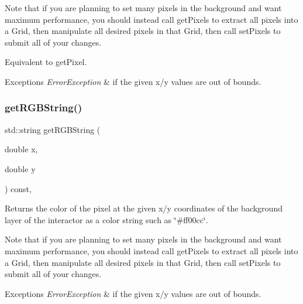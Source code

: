 Note that if you are planning to set many pixels in the background and want maximum performance, you should instead call get\+Pixels to extract all pixels into a Grid, then manipulate all desired pixels in that Grid, then call set\+Pixels to submit all of your changes.

Equivalent to get\+Pixel.


\begin{DoxyExceptions}{Exceptions}
{\em Error\+Exception} & if the given x/y values are out of bounds. \\
\hline
\end{DoxyExceptions}
\mbox{\label{classsgl_1_1GDrawingSurface_a456d3582acc3544f37d939f5cb8802fe}} 
\subsubsection{\texorpdfstring{get\+R\+G\+B\+String()}{getRGBString()}}
{\footnotesize\ttfamily std\+::string get\+R\+G\+B\+String (\begin{DoxyParamCaption}\item[{double}]{x,  }\item[{double}]{y }\end{DoxyParamCaption}) const\hspace{0.3cm}{\ttfamily [virtual]}, {\ttfamily [inherited]}}



Returns the color of the pixel at the given x/y coordinates of the background layer of the interactor as a color string such as \char`\"{}\#ff00cc\char`\"{}. 

Note that if you are planning to set many pixels in the background and want maximum performance, you should instead call get\+Pixels to extract all pixels into a Grid, then manipulate all desired pixels in that Grid, then call set\+Pixels to submit all of your changes.


\begin{DoxyExceptions}{Exceptions}
{\em Error\+Exception} & if the given x/y values are out of bounds. \\
\hline
\end{DoxyExceptions}
\mbox{\label{classsgl_1_1GInteractor_a7b4eec96a2bdc6420695d5796a78eea9}} 
